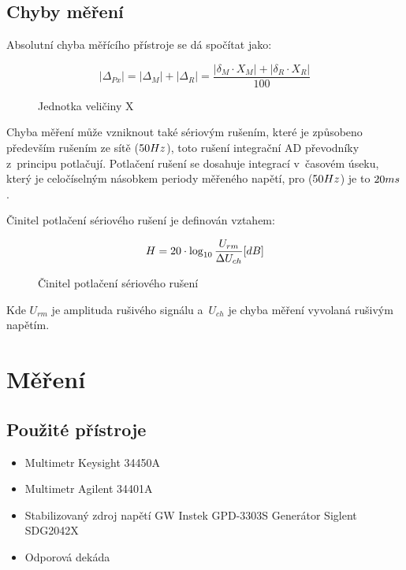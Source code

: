 \documentclass{article}
\begin{document}
\subsection{Chyby měření}
Absolutní chyba měřícího přístroje se dá spočítat jako:

\begin{figure}[H]
    \begin{equation}
        |\Delta_{Px}| = |\Delta_{M}|+|\Delta_{R}| = \frac{|\delta_M\cdot X_M|+|\delta_R\cdot X_R|}{100}
    \end{equation}
    \caption{\label{proud_kolektoru}Jednotka veličiny X}
\end{figure}
Chyba měření může vzniknout také sériovým rušením, které je způsobeno především rušením ze sítě (\(50\-Hz\)), toto rušení integrační AD převodníky z~principu potlačují.
Potlačení rušení se dosahuje integrací v~časovém úseku, který je celočíselným násobkem periody měřeného napětí, pro (\(50\-Hz\)) je to \(20\-ms\).

Činitel potlačení sériového rušení je definován vztahem:
\begin{figure}[H]
    \begin{equation}
        H = 20 \cdot \log_{10}\frac{U_{rm}}{\Delta U_{ch}}\-[dB]
    \end{equation}
    \caption{\label{cinitel_potlaceni} Činitel potlačení sériového rušení}
\end{figure}
Kde \(U_{rm}\) je amplituda rušivého signálu a~\(U_{ch}\) je chyba měření vyvolaná rušivým napětím.


\section{Měření}
\subsection{Použité přístroje}
\begin{itemize}
    \item Multimetr Keysight 34450A
    \item Multimetr Agilent 34401A
    \item Stabilizovaný zdroj napětí GW Instek GPD-3303S Generátor Siglent SDG2042X
    \item Odporová dekáda
\end{itemize}
\end{document}
